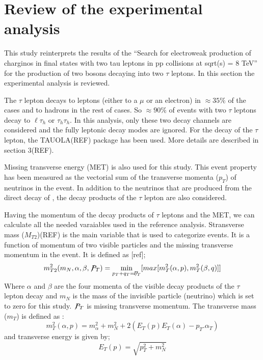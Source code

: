 \section{Review of the experimental analysis}


This study reinterprets the results of the ``Search for electroweak production of charginos in final states with two tau leptons in pp collisions at sqrt(s) = 8 TeV''\cite{Khachatryan:2016trj} for the production of two \wprime bosons decaying into two $\tau$ leptons. In this section the experimental analysis is reviewed.

The $\tau$ lepton decays to leptons (either to a $\mu$ or an electron) in $\approx 35\%$ of the cases and to hadrons in the rest of cases. So $\approx 90\%$ of events with two $\tau$ leptons decay to $\ell\tau_h$ or $\tau_h \tau_h$. In this analysis, only these two decay channels are considered and the fully leptonic decay modes are ignored. For the decay of the $\tau$ lepton, the TAUOLA(REF) package has been used. More details are described in section 3(REF).

Missing transverse energy (MET) is also used for this study. This event property has been measured as the vectorial sum of the transverse momenta ($p_{T}$) of neutrinos in the event. In addition to the neutrinos that are produced from the direct decay of \wprime, the decay products of the $\tau$ lepton are also considered. %

Having the momentum of the decay products of $\tau$ leptons and the MET, we can calculate all the needed varaiables used in the reference analysis. Stransverse mass ($M_{T2}$)(REF) is the main variable that is used to categorize events. It is a function of momentum of two visible particles and the missing transverse momentum in the event. It is defined as [ref];
\begin{equation}
m^2_{T2}(m_{N},\alpha,\beta,\not\!P_{T}) = \displaystyle\min_{p_T+q_T=\not\!P_T} [max[m^2_{T}(\alpha,p),m^2_{T}(\beta,q)]]
\end{equation}
Where $\alpha$ and $\beta$ are the four momenta of the visible decay products of the $\tau$ lepton decay and  $m_N$ is the mass of the invisible particle (neutrino) which is set to zero for this study. $\not\!P_T$ is missing transverse momentum. The transverse mass ($m_{T}$) is defined as :
\begin{equation}
m^2_{T}(\alpha,p) =  m^2_{\alpha}+m^2_N+2(E_T(p)E_T(\alpha)-p_T.\alpha_T)
\end{equation}
and transverse energy is given by; 
\begin{equation}
E_T(p)=\sqrt{p^2_T+m^2_N}
\end{equation}

